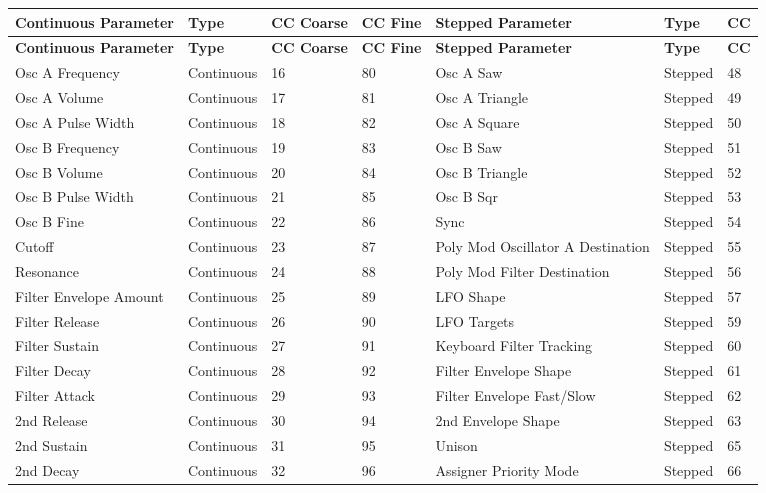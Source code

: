 \begin{longtable}[l]{ p{5cm}|p{2cm}|p{1.5cm}|p{1.5cm}|p{5cm}|p{2cm}|p{1cm}} 
\textbf{Continuous Parameter} & \textbf{Type} & \textbf{CC Coarse} & \textbf{CC Fine} & \textbf{Stepped Parameter} & \textbf{Type} & \textbf{CC} \\ \hline
\endfirsthead
\textbf{Continuous Parameter} & \textbf{Type} & \textbf{CC Coarse} & \textbf{CC Fine} & \textbf{Stepped Parameter} & \textbf{Type} & \textbf{CC} \\ \hline
\endhead 
Osc A Frequency & Continuous & 16 & 80 & Osc A Saw & Stepped & 48 \\ \hline
Osc A Volume & Continuous & 17 & 81 & Osc A Triangle & Stepped & 49 \\ \hline
Osc A Pulse Width & Continuous & 18 & 82 & Osc A Square & Stepped & 50 \\ \hline
Osc B Frequency & Continuous & 19 & 83 & Osc B Saw & Stepped & 51 \\ \hline
Osc B Volume & Continuous & 20 & 84 & Osc B Triangle & Stepped & 52 \\ \hline
Osc B Pulse Width & Continuous & 21 & 85 & Osc B Sqr & Stepped & 53 \\ \hline
Osc B Fine & Continuous & 22 & 86 & Sync & Stepped & 54 \\ \hline
Cutoff & Continuous & 23 & 87 & Poly Mod Oscillator A Destination & Stepped & 55 \\ \hline
Resonance & Continuous & 24 & 88 & Poly Mod Filter Destination & Stepped & 56 \\ \hline
Filter Envelope Amount & Continuous & 25 & 89 & LFO Shape & Stepped & 57 \\ \hline
Filter Release  &  Continuous  & 26 & 90 &  LFO Targets  &  Stepped  &  59 \\ \hline
Filter Sustain  &  Continuous  & 27 & 91 &  Keyboard Filter Tracking  &  Stepped  &  60 \\ \hline
Filter Decay  &  Continuous  & 28 & 92 &  Filter Envelope Shape  &  Stepped  &  61 \\ \hline
Filter Attack  &  Continuous  & 29 & 93 &  Filter Envelope Fast/Slow  &  Stepped  &  62 \\ \hline
2nd Release  &  Continuous  & 30 & 94 &  2nd Envelope Shape  &  Stepped  &  63 \\ \hline
2nd Sustain  &  Continuous  & 31 & 95 &  Unison  &  Stepped  &  65 \\ \hline
2nd Decay  &  Continuous  & 32 & 96 &  Assigner Priority Mode  &  Stepped  &  66 \\ \hline

\end{longtable}
